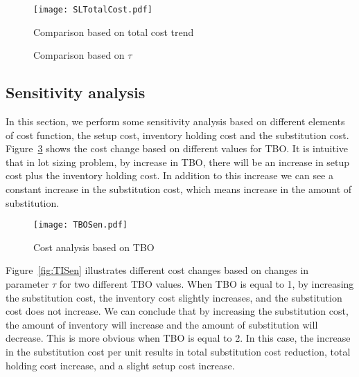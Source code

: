 \documentclass[10pt]{article}
\begin{document}
\begin{figure}[!h]
\begin{center}
\texttt{[image: SLTotalCost.pdf]}
\caption{Comparison based on total cost trend} 
\label{fig:SLTotalCost}
\end{center}
\end{figure}


\begin{figure}[H]
    \centering
    \caption{Comparison based on $\tau$}%
    \label{fig:TIComp}%
\end{figure}

\subsection{Sensitivity analysis}
In this section, we perform some sensitivity analysis based on different elements of cost function, the setup cost, inventory holding cost and the substitution cost. 
Figure~\ref{fig:TBOSen} shows the cost change based on different values for TBO. It is intuitive that in lot sizing problem, by increase in TBO, there will be an increase in setup cost plus the inventory holding cost. In addition to this increase we can see a constant increase in the substitution cost, which means increase in the amount of substitution. 

\begin{figure}[H]
\begin{center}
\texttt{[image: TBOSen.pdf]}
\caption{Cost analysis based on TBO} 
\label{fig:TBOSen}
\end{center}
\end{figure}

Figure~\ref{fig:TISen} illustrates different cost changes based on changes in parameter $\tau$ for two different TBO values. When TBO is equal to 1, by increasing the substitution cost, the inventory cost slightly increases, and the substitution cost does not increase. We can conclude that by increasing the substitution cost, the amount of inventory will increase and the amount of substitution will decrease. This is more obvious when TBO is equal to 2. In this case, the increase in the substitution cost per unit results in total substitution cost reduction, total holding cost increase, and a slight setup cost increase.  
\end{document}
